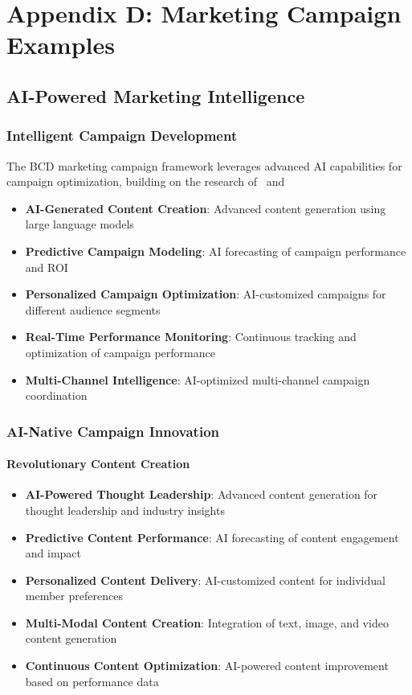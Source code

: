 \documentclass[12pt,a4paper]{book}
\begin{document}
\chapter{Appendix D: Marketing Campaign Examples}

\section{AI-Powered Marketing Intelligence}

\subsection{Intelligent Campaign Development}

The BCD marketing campaign framework leverages advanced AI capabilities for campaign optimization, building on the research of \ and \:

\begin{itemize}
    \item \textbf{AI-Generated Content Creation}: Advanced content generation using large language models
    \item \textbf{Predictive Campaign Modeling}: AI forecasting of campaign performance and ROI
    \item \textbf{Personalized Campaign Optimization}: AI-customized campaigns for different audience segments
    \item \textbf{Real-Time Performance Monitoring}: Continuous tracking and optimization of campaign performance
    \item \textbf{Multi-Channel Intelligence}: AI-optimized multi-channel campaign coordination
\end{itemize}

\subsection{AI-Native Campaign Innovation}

\subsubsection{Revolutionary Content Creation}

\begin{itemize}
    \item \textbf{AI-Powered Thought Leadership}: Advanced content generation for thought leadership and industry insights
    \item \textbf{Predictive Content Performance}: AI forecasting of content engagement and impact
    \item \textbf{Personalized Content Delivery}: AI-customized content for individual member preferences
    \item \textbf{Multi-Modal Content Creation}: Integration of text, image, and video content generation
    \item \textbf{Continuous Content Optimization}: AI-powered content improvement based on performance data
\end{itemize}
\end{document}

